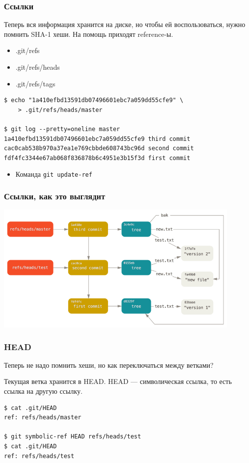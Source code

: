 \documentclass[xetex,mathserif,serif]{beamer}
\begin{document}
    \begin{frame}[fragile]
        \frametitle{Ссылки}
        Теперь вся информация хранится на диске, но чтобы ей воспользоваться, нужно помнить SHA-1 хеши. На помощь приходят reference-ы. 

        \begin{itemize}
            \item .git/refs
            \item .git/refs/heads
            \item .git/refs/tags
        \end{itemize}

        \begin{verbatim}
$ echo "1a410efbd13591db07496601ebc7a059dd55cfe9" \
    > .git/refs/heads/master

$ git log --pretty=oneline master
1a410efbd13591db07496601ebc7a059dd55cfe9 third commit
cac0cab538b970a37ea1e769cbbde608743bc96d second commit
fdf4fc3344e67ab068f836878b6c4951e3b15f3d first commit
        \end{verbatim}
        \begin{itemize}
            \item Команда \verb|git update-ref|
        \end{itemize}
    \end{frame}

    \begin{frame}
        \frametitle{Ссылки, как это выглядит}
        \begin{center}
            \includegraphics[width=0.9\textwidth]{gitRefs.png}
        \end{center}
    \end{frame}

    \begin{frame}[fragile]
        \frametitle{HEAD}
        Теперь не надо помнить хеши, но как переключаться между ветками?

        Текущая ветка хранится в HEAD. HEAD --- символическая ссылка, то есть ссылка на другую ссылку.
        \begin{verbatim}
$ cat .git/HEAD
ref: refs/heads/master

$ git symbolic-ref HEAD refs/heads/test
$ cat .git/HEAD
ref: refs/heads/test
        \end{verbatim}
    \end{frame}
\end{document}
